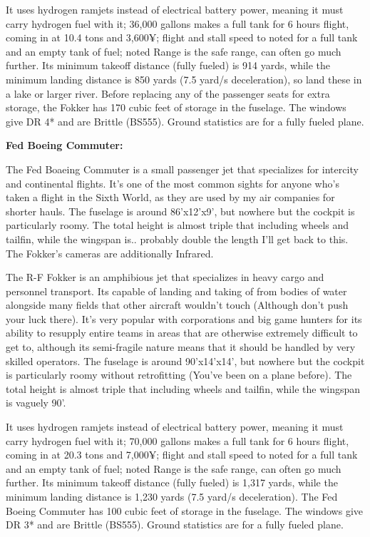 It uses hydrogen ramjets instead of electrical battery power, meaning it must carry hydrogen fuel with it; 36,000 gallons makes a full tank for 6 hours flight, coming in at 10.4 tons and 3,600¥; flight and stall speed to noted for a full tank and an empty tank of fuel; noted Range is the safe range, can often go much further. Its minimum takeoff distance (fully fueled) is 914 yards, while the minimum landing distance is 850 yards (7.5 yard/s deceleration), so land these in a lake or larger river. Before replacing any of the passenger seats for extra storage, the Fokker has 170 cubic feet of storage in the fuselage. The windows give DR 4* and are Brittle (BS555). Ground statistics are for a fully fueled plane.

\textbf{Fed Boeing Commuter:}

The Fed Boaeing Commuter is a small passenger jet that specializes for intercity and continental flights. It's one of the most common sights for anyone who's taken a flight in the Sixth World, as they are used by my air companies for shorter hauls. The fuselage is around 86'x12'x9', but nowhere but the cockpit is particularly roomy. The total height is almost triple that including wheels and tailfin, while the wingspan is.. probably double the length I'll get back to this. The Fokker's cameras are additionally Infrared.

The R-F Fokker is an amphibious jet that specializes in heavy cargo and personnel transport. Its capable of landing and taking of from bodies of water alongside many fields that other aircraft wouldn't touch (Although don't push your luck there). It's very popular with corporations and big game hunters for its ability to resupply entire teams in areas that are otherwise extremely difficult to get to, although its semi-fragile nature means that it should be handled by very skilled operators. The fuselage is around 90'x14'x14', but nowhere but the cockpit is particularly roomy without retrofitting (You've been on a plane before). The total height is almost triple that including wheels and tailfin, while the wingspan is vaguely 90'.

It uses hydrogen ramjets instead of electrical battery power, meaning it must carry hydrogen fuel with it; 70,000 gallons makes a full tank for 6 hours flight, coming in at 20.3 tons and 7,000¥; flight and stall speed to noted for a full tank and an empty tank of fuel; noted Range is the safe range, can often go much further. Its minimum takeoff distance (fully fueled) is 1,317 yards, while the minimum landing distance is 1,230 yards (7.5 yard/s deceleration). The Fed Boeing Commuter has 100 cubic feet of storage in the fuselage. The windows give DR 3* and are Brittle (BS555). Ground statistics are for a fully fueled plane.

